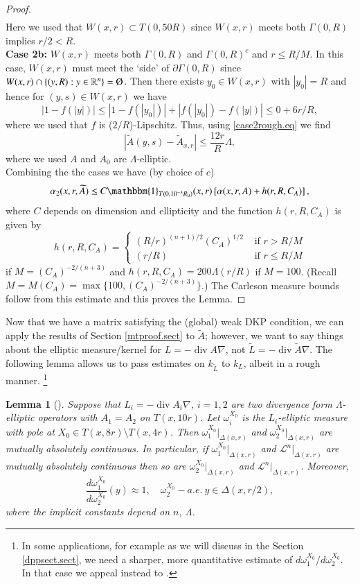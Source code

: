 \documentclass[11pt, a4paper,leqno]{amsart}
\theoremstyle{plain}
\newtheorem{lemma}[equation]{Lemma}
\theoremstyle{definition}
\theoremstyle{remark}
\numberwithin{equation}{section}
\newcommand{\rn}{\mathbb{R}^n}
\newcommand{\hm}{\omega}
\renewcommand{\emptyset}{\mbox{\textup{\O}}}
\def\div{\mathop{\operatorname{div}}\nolimits}
\begin{document}
\begin{proof}
\begin{align*}
\end{align*}
Here we used that $W(x,r) \subset T(0,50R)$ since $W(x,r)$ meets both $\Gamma(0,R)$ implies $r/2 < R$.
\\ {\bf Case 2b:} $W(x,r)$ meets both $\Gamma(0,R)$ and $\Gamma(0,R)^c$ and $r \le R/M$. In this case, $W(x,r)$ must meet the `side' of $\partial \Gamma(0,R)$ since $W(x,r) \cap \{(y,R): y \in \rn\} = \emptyset$. Then there exists $y_0 \in W(x,r)$ with $|y_0| = R$ and hence for $(y,s) \in W(x,r)$ we have
\[|1 - f(|y|)| \le |1 - f(|y_0|)| + |f(|y_0|)  - f(|y|)| \le 0 + 6r/R,\]
where we used that $f$ is ($2/R$)-Lipschitz. Thus, using \eqref{case2rough.eq} we find
\[|\widetilde{A}(y,s) -\widetilde{A}_{x,r}| \le \frac{12r}{R} \Lambda,\]
where we used $A$ and $A_0$ are $\Lambda$-elliptic.
\\ 
Combining the the cases we have (by choice of $c$)
\[\alpha_2(x,r, \widetilde{A}) \le C\mathbbm{1}_{T(0,10^{-3}R_0)}(x,r) \left[\alpha(x,r, A) + h(r,R, C_A)\right],\]
where $C$ depends on dimension and ellipticity and the function $h(r,R,C_A)$ is given by 
\[ h(r,R,C_A) = \begin{cases}
 (R/r)^{(n+1)/2}  (C_A)^{1/2} & \text{ if } r > R/M \\ 
  (r/R) & \text{ if } r \le R/M
\end{cases}
\] 
if $M  = (C_A)^{-2/(n+3)}$  and $h(r,R,C_A) = 200\Lambda(r/R)$ if $M = 100$. (Recall $M = M(C_A) = \max\{100, (C_A)^{-2/(n+3)}\}$.)
 The Carleson measure bounds follow from this estimate and this proves the Lemma.
\end{proof}


Now that we have a matrix satisfying the (global) weak DKP condition, we can apply the results of Section \ref{mtproof.sect} to $\widetilde{A}$; however, we want to say things about the elliptic measure/kernel for $L = -\div A\nabla$, not $\widetilde{L} = -\div \widetilde{A} \nabla$. The following lemma allows us to pass estimates on $k_{\widetilde{L}}$ to $k_{L}$, albeit in a rough manner. \footnote{In some applications, for example as we will discuss in the Section \ref{dppsect.sect}, we need a sharper, more quantitative estimate of $d\omega_1^{X_0}/d\omega_2^{X_0}$. In that case we appeal instead to \cite[Lemma 5.1 and Remark 5.11]{BTZ}.}

\begin{lemma}[{\cite[Lemma 2.22]{BTZ}}]\label{roughcompdifop.lem}
Suppose that $L_i = -\div A_i \nabla$, $i = 1,2$ are two divergence form $\Lambda$-elliptic operators with $A_1 = A_2$ on $T(x,10r)$. Let $\hm_i^{X_0}$ is the $L_i$-elliptic measure with pole at $X_0\in  T(x,8r) \setminus T(x,4r)$.
Then $\hm_1^{X_0}|_{\Delta(x,r)}$ and $\hm_2^{X_0}|_{\Delta(x,r)}$ are mutually absolutely continuous. In particular, if $\hm_1^{X_0}|_{\Delta(x,r)}$ and $\mathcal{L}^n|_{\Delta(x,r)} $ are mutually absolutely continuous then so are $\hm_2^{X_0}|_{\Delta(x,r)}$ and $\mathcal{L}^n|_{\Delta(x,r)} $. 
Moreover,
\[\frac{d\hm_1^{X_0}}{d\hm_2^{X_0}}(y) \approx 1, \quad \hm_2^{X_0}-a.e.\ y \in \Delta(x,r/2),\]
where the implicit constants depend on $n$, $\Lambda$.
\end{lemma}
\end{document}
